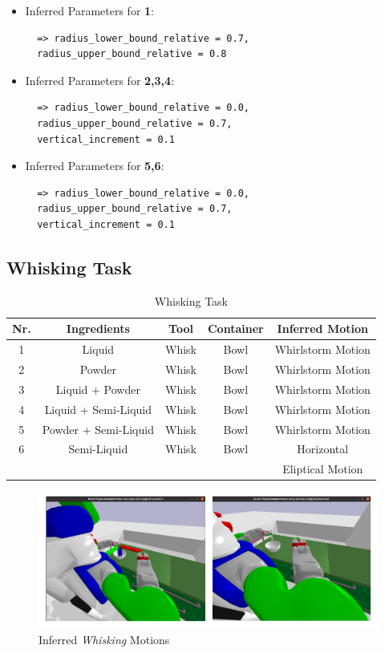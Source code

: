 \begin{itemize}
\item Inferred Parameters for \textbf{1}: 
 \begin{lstlisting}
  => radius_lower_bound_relative = 0.7, 
  radius_upper_bound_relative = 0.8
\end{lstlisting}
\item Inferred Parameters for \textbf{2,3,4}:
\begin{lstlisting}
  => radius_lower_bound_relative = 0.0, 
  radius_upper_bound_relative = 0.7,
  vertical_increment = 0.1
\end{lstlisting}
\item Inferred Parameters for \textbf{5,6}:
\begin{lstlisting}
  => radius_lower_bound_relative = 0.0, 
  radius_upper_bound_relative = 0.7,
  vertical_increment = 0.1
\end{lstlisting}
\end{itemize}

\subsection{Whisking Task}

\begin{table}[H]
  \centering
  \begin{tabular}{|c|c|c|c|c|}
    \hline
    \textbf{Nr.} & \textbf{Ingredients} & \textbf{Tool} & \textbf{Container} & \textbf{Inferred Motion}  \\
    \hline
    1 & Liquid & Whisk & Bowl & Whirlstorm Motion \\
    \hline
    2 & Powder & Whisk & Bowl & Whirlstorm Motion\\
    \hline
    3 & Liquid + Powder & Whisk & Bowl & Whirlstorm Motion \\
    \hline
    4 & Liquid + Semi-Liquid & Whisk & Bowl & Whirlstorm Motion \\
    \hline
    5 & Powder + Semi-Liquid & Whisk & Bowl & Whirlstorm Motion \\
    \hline
    6 & Semi-Liquid & Whisk & Bowl & Horizontal
    \\ & & &  &Eliptical Motion \\
    \hline
  \end{tabular}
  \caption{Whisking Task}
  \label{tab:mixingtask}
\end{table}
\begin{figure}[H]
  \includegraphics[scale=0.25]{Graphics/whisking_evaluation.jpg}
  \caption{Inferred \textit{Whisking} Motions}
  \label{fig:mixingverb WikiHow}
\end{figure}

